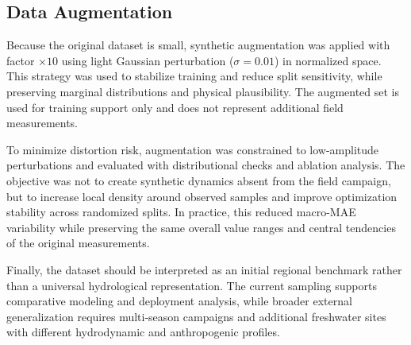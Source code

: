 \subsection{Data Augmentation}
Because the original dataset is small, synthetic augmentation was applied with factor $\times 10$ using light Gaussian perturbation ($\sigma=0.01$) in normalized space. This strategy was used to stabilize training and reduce split sensitivity, while preserving marginal distributions and physical plausibility. The augmented set is used for training support only and does not represent additional field measurements.

To minimize distortion risk, augmentation was constrained to low-amplitude perturbations and evaluated with distributional checks and ablation analysis. The objective was not to create synthetic dynamics absent from the field campaign, but to increase local density around observed samples and improve optimization stability across randomized splits. In practice, this reduced macro-MAE variability while preserving the same overall value ranges and central tendencies of the original measurements.

Finally, the dataset should be interpreted as an initial regional benchmark rather than a universal hydrological representation. The current sampling supports comparative modeling and deployment analysis, while broader external generalization requires multi-season campaigns and additional freshwater sites with different hydrodynamic and anthropogenic profiles.

